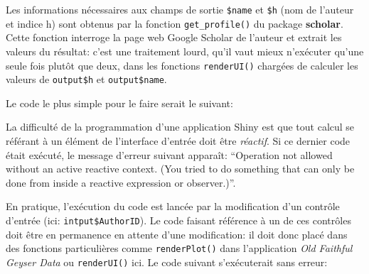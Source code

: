 \documentclass[
  12pt,
  french,
  a4paper,
  extrafontsizes,onecolumn,openright
  ]{memoir}
\newenvironment{Shaded}{\begin{snugshade}}{\end{snugshade}}
\newcommand{\CommentTok}[1]{\textcolor[rgb]{0.56,0.35,0.01}{\textit{#1}}}
\newcommand{\FunctionTok}[1]{\textcolor[rgb]{0.13,0.29,0.53}{\textbf{#1}}}
\newcommand{\NormalTok}[1]{#1}
\newcommand{\OtherTok}[1]{\textcolor[rgb]{0.56,0.35,0.01}{#1}}
\newcommand{\SpecialCharTok}[1]{\textcolor[rgb]{0.81,0.36,0.00}{\textbf{#1}}}
\newlength{\rf}
\begin{document}
\normalsize

Les informations nécessaires aux champs de sortie \texttt{\$name} et \texttt{\$h} (nom de l'auteur et indice h) sont obtenus par la fonction \texttt{get\_profile()} du package \textbf{scholar}.
Cette fonction interroge la page web Google Scholar de l'auteur et extrait les valeurs du résultat: c'est une traitement lourd, qu'il vaut mieux n'exécuter qu'une seule fois plutôt que deux, dans les fonctions \texttt{renderUI()} chargées de calculer les valeurs de \texttt{output\$h} et \texttt{output\$name}.

Le code le plus simple pour le faire serait le suivant:

\scriptsize

\begin{Shaded}
\end{Shaded}

\normalsize

La difficulté de la programmation d'une application Shiny est que tout calcul se référant à un élément de l'interface d'entrée doit être \emph{réactif}.
Si ce dernier code était exécuté, le message d'erreur suivant apparaît:
\enquote{Operation not allowed without an active reactive context. (You tried to do something that can only be done from inside a reactive expression or observer.)}.

En pratique, l'exécution du code est lancée par la modification d'un contrôle d'entrée (ici: \texttt{intput\$AuthorID}).
Le code faisant référence à un de ces contrôles doit être en permanence en attente d'une modification: il doit donc placé dans des fonctions particulières comme \texttt{renderPlot()} dans l'application \emph{Old Faithful Geyser Data} ou \texttt{renderUI()} ici.
Le code suivant s'exécuterait sans erreur:

\scriptsize

\begin{Shaded}
\end{Shaded}
\end{document}
